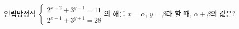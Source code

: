 연립방정식 $\begin{cases} 2^{x+2}+3^{y-1}=11 \\ 2^{x-1}+3^{y+1}=28 \end{cases}$의 해를 $x=\alpha$, $y=\beta$라 할 때, $\alpha+\beta$의 값은?

